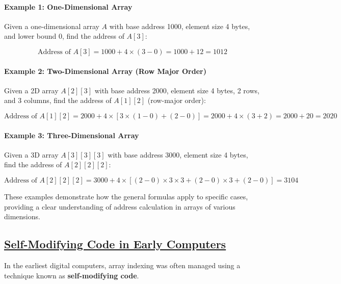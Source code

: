 \documentclass{book}
\begin{document}
\paragraph{Example 1: One-Dimensional Array}
Given a one-dimensional array \( A \) with base address 1000, element size 4 bytes, and lower bound 0, find the address of \( A[3] \):

\[
\text{Address of } A[3] = 1000 + 4 \times (3 - 0) = 1000 + 12 = 1012
\]

\paragraph{Example 2: Two-Dimensional Array (Row Major Order)}
Given a 2D array \( A[2][3] \) with base address 2000, element size 4 bytes, 2 rows, and 3 columns, find the address of \( A[1][2] \) (row-major order):

\[
\text{Address of } A[1][2] = 2000 + 4 \times \left[ 3 \times (1 - 0) + (2 - 0) \right] = 2000 + 4 \times (3 + 2) = 2000 + 20 = 2020
\]

\paragraph{Example 3: Three-Dimensional Array}
Given a 3D array \( A[3][3][3] \) with base address 3000, element size 4 bytes, find the address of \( A[2][2][2] \):

\[\text{Address of } A[2][2][2] = 3000 + 4 \times \left[ (2 - 0) \times 3 \times 3 + (2 - 0) \times 3 + (2 - 0) \right] = 3104\]

These examples demonstrate how the general formulas apply to specific cases, providing a clear understanding of address calculation in arrays of various dimensions.


	\subsection{\href{https://en.wikipedia.org/wiki/Self-modifying_code}{Self-Modifying Code in Early Computers}}
	
	In the earliest digital computers, array indexing was often managed using a technique known as \textbf{self-modifying code}.
	
\end{document}
